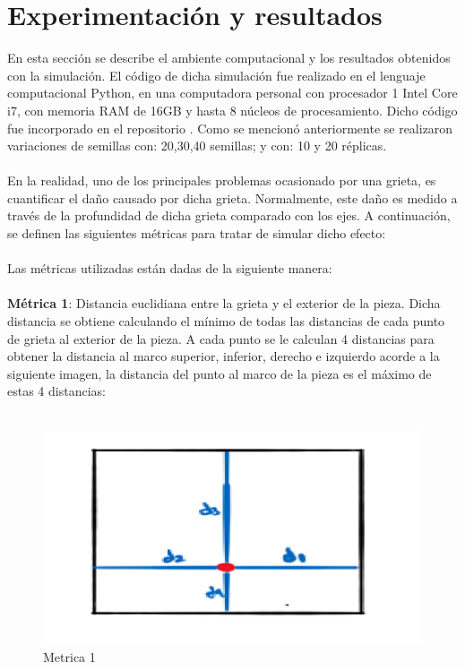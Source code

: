 \documentclass{article}
\begin{document}
\section{Experimentación y resultados}
En esta sección se describe el ambiente computacional y los resultados obtenidos con la simulación. El código de dicha simulación fue realizado en el lenguaje computacional Python, en una computadora personal con procesador 1 Intel Core i7, con memoria RAM de 16GB y hasta 8 núcleos de procesamiento. Dicho código fue incorporado en el repositorio \cite{p_4}. 
Como se mencionó anteriormente se realizaron variaciones de semillas con:  20,30,40 semillas; y con: 10 y 20 réplicas.\\
\\
En la realidad, uno de los principales problemas ocasionado por una grieta, es cuantificar el daño causado por dicha grieta. Normalmente, este daño es medido a través de la profundidad de dicha grieta comparado con los ejes. A continuación, se definen las siguientes métricas para tratar de simular dicho efecto:\\
\\
Las métricas utilizadas están dadas de la siguiente manera:\\
\\
\textbf{Métrica 1}: Distancia euclidiana entre la grieta y el exterior de la pieza. Dicha distancia se obtiene calculando el mínimo de todas las distancias de cada punto de grieta al exterior de la pieza. A cada punto se le calculan 4 distancias para obtener la distancia al marco superior, inferior, derecho e izquierdo acorde a la siguiente imagen, la distancia del punto al marco de la pieza es el máximo de estas 4 distancias:\\
\\
\begin{figure}[h]
	\centering
	\includegraphics[width=0.7\linewidth]{imagen1}
	\caption{Metrica 1}
	\label{fig:imagen1}
\end{figure}
\\
\end{document}
